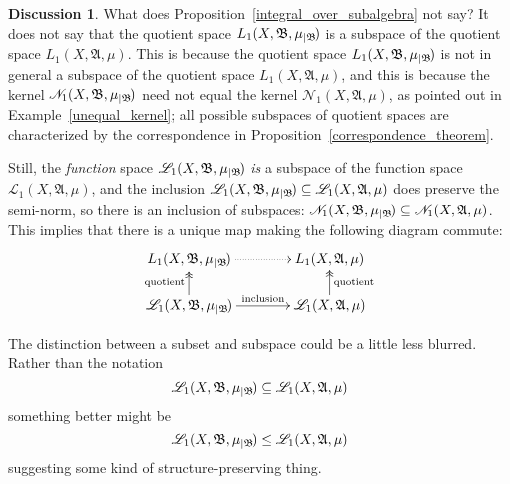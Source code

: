 \documentclass[
twoside=true,
paper=letter,
fontsize=11pt,
pagesize=auto,
leqno,
openany,
headsepline,
overfullrule,
]{scrbook}
\theoremstyle{plain}
\theoremstyle{plain}
\theoremstyle{definition}
\newtheorem{discussion}[thm]{Discussion}
\theoremstyle{bfnoteitalic}
\theoremstyle{bfnoteroman}
\newcommand{\sigalg}[1]{\mathfrak{#1}}
\newcommand{\cali}[1]{\mathscr{#1}}
\newcommand{\restrictedto}[1]{_{\lvert#1}\kern-1.5pt}
\newcommand{\sigmaalgebra}{\sigalg{A}}
\newcommand{\sigmaalgebraii}{\sigalg{B}}
\newcommand{\measurespace}{X}
\newcommand{\measure}{\mu}
\begin{document}
\begin{discussion}\label{L1_subspace_embedding}
What does Proposition~\ref{integral_over_subalgebra} not say?
It does not say that the quotient space $L_1(\measurespace, \sigmaalgebraii, \measure\restrictedto{\sigmaalgebraii})$
is a subspace of the quotient space 
$L_1(\measurespace, \sigmaalgebra, \measure)$.  This is because the quotient space $L_1(\measurespace, \sigmaalgebraii, \measure\restrictedto{\sigmaalgebraii})$
is not in general a subspace of the quotient space 
$L_1(\measurespace, \sigmaalgebra, \measure)$, 
and this is because the kernel
$\cali{N}_1(\measurespace, \sigmaalgebraii, \measure\restrictedto{\sigmaalgebraii})$
need not equal the kernel
$\cali{N}_1(\measurespace, \sigmaalgebra, \measure)$,
as pointed out in 
Example~\ref{unequal_kernel};
all possible subspaces of quotient spaces are characterized by the correspondence 
in Proposition~\ref{correspondence_theorem}.

Still, the \emph{function} space
$\cali{L}_1(\measurespace, \sigmaalgebraii, \measure\restrictedto{\sigmaalgebraii})$
\emph{is} a subspace of the function space
$\cali{L}_1(\measurespace, \sigmaalgebra, \measure)$,
and the inclusion 
$\cali{L}_1(\measurespace, \sigmaalgebraii, \measure\restrictedto{\sigmaalgebraii})
\subseteq
\cali{L}_1(\measurespace, \sigmaalgebra, \measure)$
does preserve the semi-norm, so there is an inclusion of subspaces: 
$\cali{N}_1(\measurespace, \sigmaalgebraii, \measure\restrictedto{\sigmaalgebraii})
\subseteq
\cali{N}_1(\measurespace, \sigmaalgebra, \measure)$. This implies that
there is a unique map making the following diagram commute:
\[
\xymatrix@R=16pt@C=38pt{ 
L_1(\measurespace, \sigmaalgebraii, \measure\restrictedto{\sigmaalgebraii})
\ar@{.>}[r]
&
L_1(\measurespace, \sigmaalgebra, \measure)
\\
\cali{L}_1(\measurespace, \sigmaalgebraii, \measure\restrictedto{\sigmaalgebraii}) \ar[r]^-{\text{inclusion}} 
\ar@{->>}[u]^{\text{quotient}}
&
\cali{L}_1(\measurespace, \sigmaalgebra, \measure)
\ar@{->>}[u]_{\text{quotient}}
}
\]
\end{discussion}






\label{subset_vs_subspace}
\begin{quoting}
\small
The distinction between a subset and subspace could be a little less blurred.  Rather than the notation 
\[
\cali{L}_1(\measurespace, \sigmaalgebraii, \measure\restrictedto{\sigmaalgebraii})
\subseteq
\cali{L}_1(\measurespace, \sigmaalgebra, \measure)
\]
something better might be
\[
\cali{L}_1(\measurespace, \sigmaalgebraii, \measure\restrictedto{\sigmaalgebraii})
\leq
\cali{L}_1(\measurespace, \sigmaalgebra, \measure)
\]
suggesting some kind of structure-preserving thing.
\end{quoting}
\end{document}
